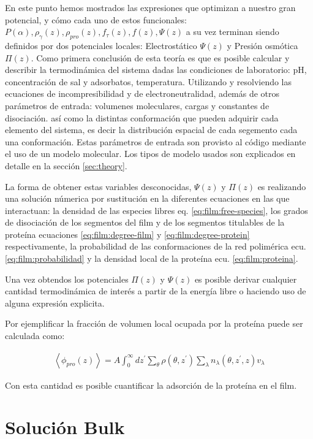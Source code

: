 En este punto hemos mostrados las expresiones que optimizan a nuestro gran potencial, y c\'omo cada uno de estos funcionales: $P(\alpha), \rho_\gamma(z),\rho_{pro}(z), f_\tau(z), f(z), \Psi(z) $ a su vez  terminan siendo definidos por dos potenciales locales: Electrost\'atico $\Psi(z)$ y Presi\'on osm\'otica $\Pi(z)$. 
Como primera conclusi\'on de esta teor\'ia es que es posible calcular y describir la termodin\'amica del sistema dadas las condiciones de laboratorio: pH, concentraci\'on de sal y adsorbatos, temperatura. Utilizando y resolviendo las ecuaciones de incompresibilidad y de electroneutralidad, adem\'as de otros par\'ametros de entrada: volumenes moleculares, cargas y constantes de disociaci\'on. as\'i como la distintas conformaci\'on que pueden adquirir cada elemento del sistema, es decir la distribuci\'on espacial de cada segemento cada una conformaci\'on.
Estas par\'ametros de entrada son provisto al c\'odigo mediante el uso de un modelo molecular. Los tipos de modelo usados son explicados en detalle en la secci\'on \ref{sec:theory}. 

La forma de obtener estas variables desconocidas, $\Psi(z)$ y $\Pi(z)$  es realizando una soluci\'on n\'umerica por sustituci\'on en la diferentes ecuaciones en las que interactuan: la densidad de las especies libres eq. \ref{eq:film:free-species}, los grados de disociaci\'on de los segmentos del film y de los segmentos titulables de la prote\'ina ecuaciones \ref{eq:film:degree-film} y \ref{eq:film:degree-protein} respectivamente, la probabilidad de las conformaciones de la red polim\'erica ecu. \ref{eq:film:probabilidad} y la densidad local de la prote\'ina ecu. \ref{eq:film:proteina}.

Una vez obtendos los potenciales $\Pi(z)$ y $\Psi(z)$ es posible derivar  cualquier cantidad termodin\'amica de inter\'es  a partir de la energ\'ia libre o haciendo uso de alguna expresi\'on explicita. 

Por ejemplificar la fracci\'on de volumen local ocupada por la prote\'ina puede ser calculada como:

\begin{align}
	\left< \phi_{pro}(z) \right> = A\int_0^\infty dz^\prime \sum_\theta \rho(\theta, z^\prime)\sum_\lambda n_\lambda(\theta, z^\prime, z)v_\lambda
\end{align}

Con esta cantidad es posible cuantificar la adsorci\'on de la prote\'ina en el film. 

\section{Soluci\'on Bulk}

